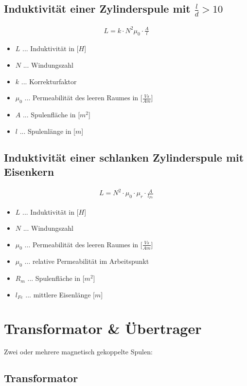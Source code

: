 \subsection{Induktivität einer Zylinderspule mit $\frac{l}{d}>10$}
\begin{align}
    L=k\cdot N^2 \mu_0 \cdot \frac{A}{l}
\end{align}
\begin{itemize}
    \item $L$ ... Induktivität in [$H$]
    \item $N$ ... Windungszahl
    \item $k$ ... Korrekturfaktor
    \item $\mu_0$ ... Permeabilität des leeren Raumes in [$\frac{Vs}{Am}$]
    \item $A$ ... Spulenfläche in [$m^2$]
    \item $l$ ... Spulenlänge in [$m$]
\end{itemize}

\subsection{Induktivität einer schlanken Zylinderspule mit Eisenkern}
\begin{align}
    L=N^2\cdot\mu_0\cdot\mu_r\cdot \frac{A}{l_{Fe}}
\end{align}
\begin{itemize}
    \item $L$ ... Induktivität in [$H$]
    \item $N$ ... Windungszahl
    \item $\mu_0$ ... Permeabilität des leeren Raumes in [$\frac{Vs}{Am}$]
    \item $\mu_0$ ... relative Permeabilität im Arbeitspunkt
    \item $R_m$ ... Spulenfläche in [$m^2$]
    \item $l_{Fe}$ ... mittlere Eisenlänge [$m$]
\end{itemize}

\newpage

\section{Transformator \& Übertrager}
Zwei oder mehrere magnetisch gekoppelte Spulen:

\subsection{Transformator}


